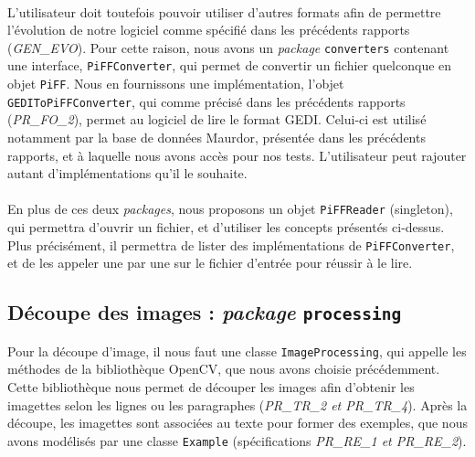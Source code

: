 \paragraph{}
L'utilisateur doit toutefois pouvoir utiliser d'autres formats afin de permettre l'évolution de notre logiciel comme spécifié dans les précédents rapports (\textit{GEN\_EVO}). Pour cette raison, nous avons un \textit{package} \texttt{converters} contenant une interface, \texttt{PiFFConverter}, qui permet de convertir un fichier quelconque en objet \texttt{PiFF}. Nous en fournissons une implémentation, l'objet \texttt{GEDIToPiFFConverter}, qui comme précisé dans les précédents rapports (\textit{PR\_FO\_2}), permet au logiciel de lire le format GEDI. Celui-ci est utilisé notamment par la base de données Maurdor, présentée dans les précédents rapports, et à laquelle nous avons accès pour nos tests. L'utilisateur peut rajouter autant d'implémentations qu'il le souhaite.

\paragraph{}
En plus de ces deux \textit{packages}, nous proposons un objet \texttt{PiFFReader} (singleton), qui permettra d'ouvrir un fichier, et d'utiliser les concepts présentés ci-dessus. Plus précisément, il permettra de lister des implémentations de \texttt{PiFFConverter}, et de les appeler une par une sur le fichier d'entrée pour réussir à le lire.

\subsection{Découpe des images : \textit{package} \texttt{processing}}

Pour la découpe d'image, il nous faut une classe \texttt{ImageProcessing}, qui appelle les méthodes de la bibliothèque OpenCV, que nous avons choisie précédemment. Cette bibliothèque nous permet de découper les images afin d'obtenir les imagettes selon les lignes ou les paragraphes (\textit{PR\_TR\_2 et PR\_TR\_4}). Après la découpe, les imagettes sont associées au texte pour former des exemples, que nous avons modélisés par une classe \texttt{Example} (spécifications \textit{PR\_RE\_1 et PR\_RE\_2}). 


